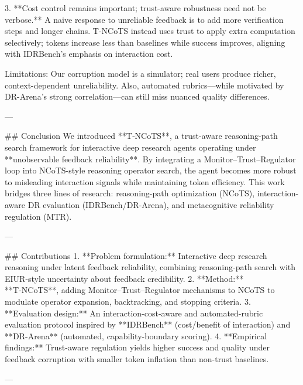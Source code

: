 3. **Cost control remains important; trust-aware robustness need not be verbose.** A naive response to unreliable feedback is to add more verification steps and longer chains. T‑NCoTS instead uses trust to apply extra computation selectively; tokens increase less than baselines while success improves, aligning with IDRBench’s emphasis on interaction cost.

Limitations: Our corruption model is a simulator; real users produce richer, context-dependent unreliability. Also, automated rubrics—while motivated by DR-Arena’s strong correlation—can still miss nuanced quality differences.

---

## Conclusion  
We introduced **T‑NCoTS**, a trust-aware reasoning-path search framework for interactive deep research agents operating under **unobservable feedback reliability**. By integrating a Monitor–Trust–Regulator loop into NCoTS-style reasoning operator search, the agent becomes more robust to misleading interaction signals while maintaining token efficiency. This work bridges three lines of research: reasoning-path optimization (NCoTS), interaction-aware DR evaluation (IDRBench/DR-Arena), and metacognitive reliability regulation (MTR).

---

## Contributions  
1. **Problem formulation:** Interactive deep research reasoning under latent feedback reliability, combining reasoning-path search with EIUR-style uncertainty about feedback credibility.  
2. **Method:** **T‑NCoTS**, adding Monitor–Trust–Regulator mechanisms to NCoTS to modulate operator expansion, backtracking, and stopping criteria.  
3. **Evaluation design:** An interaction-cost-aware and automated-rubric evaluation protocol inspired by **IDRBench** (cost/benefit of interaction) and **DR-Arena** (automated, capability-boundary scoring).  
4. **Empirical findings:** Trust-aware regulation yields higher success and quality under feedback corruption with smaller token inflation than non-trust baselines.

---